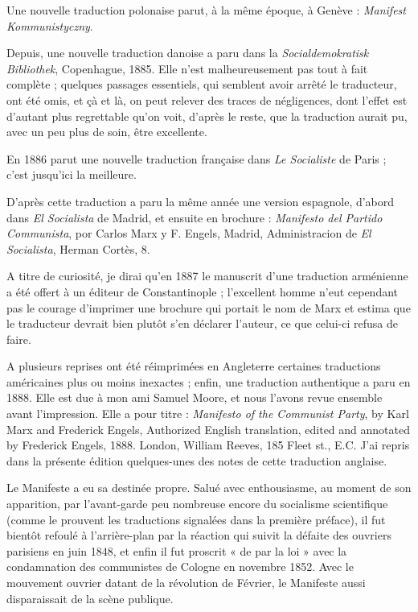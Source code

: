 \documentclass[french,twoside]{book} %
\begin{document}
\noindent  \par
Une nouvelle traduction polonaise parut, à la même époque, à Genève : \emph{Manifest Kommunistyczny}.\par
Depuis, une nouvelle traduction danoise a paru dans la \emph{Socialdemokratisk Bibliothek}, Copenhague, 1885. Elle n’est malheureusement pas tout à fait complète ; quelques passages essentiels, qui semblent avoir arrêté le traducteur, ont été omis, et çà et là, on peut relever des traces de négligences, dont l’effet est d’autant plus regrettable qu’on voit, d’après le reste, que la traduction aurait pu, avec un peu plus de soin, être excellente.\par
En 1886 parut une nouvelle traduction française dans \emph{Le Socialiste} de Paris ; c’est jusqu’ici la meilleure.\par
D'après cette traduction a paru la même année une version espagnole, d’abord dans \emph{El Socialista} de Madrid, et ensuite en brochure : \emph{Manifesto del Partido Communista}, por Carlos Marx y F. Engels, Madrid, Administracion de \emph{El Socialista}, Herman Cortès, 8.\par
A titre de curiosité, je dirai qu’en 1887 le manuscrit d’une traduction arménienne a été offert à un éditeur de Constantinople ; l’excellent homme n’eut cependant pas le courage d’imprimer une brochure qui portait le nom de Marx et estima que le traducteur devrait bien plutôt s’en déclarer l’auteur, ce que celui-ci refusa de faire.\par
A plusieurs reprises ont été réimprimées en Angleterre certaines traductions américaines plus ou moins inexactes ; enfin, une traduction authentique a paru en 1888. Elle est due à mon ami Samuel Moore, et nous l’avons revue ensemble avant l’impression. Elle a pour titre : \emph{Manifesto of the Communist Party}, by Karl Marx and Frederick Engels, Authorized English translation, edited and annotated by Frederick Engels, 1888. London, William Reeves, 185 Fleet st., E.C. J'ai repris dans la présente édition quelques-unes des notes de cette traduction anglaise.\par
Le Manifeste a eu sa destinée propre. Salué avec enthousiasme, au moment de son apparition, par l’avant-garde peu nombreuse encore du socialisme scientifique (comme le prouvent les traductions signalées dans la première préface), il fut bientôt refoulé à l’arrière-plan par la réaction qui suivit la défaite des ouvriers parisiens en juin 1848, et enfin il fut proscrit « de par la loi » avec la condamnation des communistes de Cologne en novembre 1852. Avec le mouvement ouvrier datant de la révolution de Février, le Manifeste aussi disparaissait de la scène publique.\par
\end{document}
